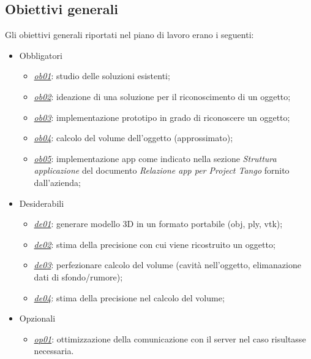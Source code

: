 \subsection{Obiettivi generali}
Gli obiettivi generali riportati nel piano di lavoro erano i seguenti:
\begin{itemize}
	\item Obbligatori
	\begin{itemize}
		\item \underline{\textit{ob01}}: studio delle soluzioni esistenti;
		\item \underline{\textit{ob02}}: ideazione di una soluzione per il riconoscimento di un oggetto;
		\item \underline{\textit{ob03}}: implementazione prototipo in grado di riconoscere un oggetto;
		\item \underline{\textit{ob04}}: calcolo del volume dell'oggetto (approssimato);
		\item \underline{\textit{ob05}}: implementazione app come indicato nella sezione \emph{Struttura applicazione} del documento \emph{Relazione app per Project Tango} fornito dall'azienda;
	\end{itemize}
	
	\item Desiderabili 
	\begin{itemize}
		\item \underline{\textit{de01}}: generare modello 3D in un formato portabile (obj, ply, vtk);
		\item \underline{\textit{de02}}: stima della precisione con cui viene ricostruito un oggetto;
		\item \underline{\textit{de03}}: perfezionare calcolo del volume (cavità nell'oggetto, elimanazione dati di sfondo/rumore);
		\item \underline{\textit{de04}}: stima della precisione nel calcolo del volume;
	\end{itemize}
	
	\item Opzionali
	\begin{itemize}
		\item \underline{\textit{op01}}: ottimizzazione della comunicazione con il server nel caso risultasse necessaria.
	\end{itemize} 
\end{itemize}

